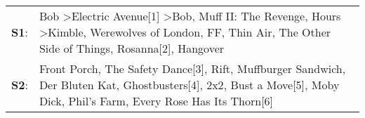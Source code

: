 \begin{supertabular}{p{0.03\textwidth}p{0.92\textwidth}}
 \textbf{S1}:  &  Bob\textsuperscript{} \textgreater \enspace Electric Avenue[1]\textsuperscript{} \textgreater \enspace Bob\textsuperscript{}, \enspace Muff II: The Revenge\textsuperscript{}, \enspace Hours\textsuperscript{} \textgreater \enspace Kimble\textsuperscript{}, \enspace Werewolves of London\textsuperscript{}, \enspace FF\textsuperscript{}, \enspace Thin Air\textsuperscript{}, \enspace The Other Side of Things\textsuperscript{}, \enspace Rosanna[2]\textsuperscript{}, \enspace Hangover\textsuperscript{}  \enspace  \\
 \textbf{S2}:  &                                                Front Porch\textsuperscript{}, \enspace The Safety Dance[3]\textsuperscript{}, \enspace Rift\textsuperscript{}, \enspace Muffburger Sandwich\textsuperscript{}, \enspace Der Bluten Kat\textsuperscript{}, \enspace Ghostbusters[4]\textsuperscript{}, \enspace 2x2\textsuperscript{}, \enspace Bust a Move[5]\textsuperscript{}, \enspace Moby Dick\textsuperscript{}, \enspace Phil's Farm\textsuperscript{}, \enspace Every Rose Has Its Thorn[6]\textsuperscript{}  \enspace  \\
\end{supertabular}
